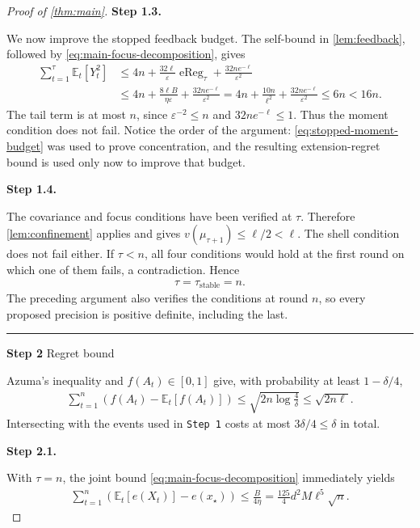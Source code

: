 \documentclass{article}
\newcommand{\proofstep}[2]{%
    \par\medskip
    \noindent
    \textcolor{blue!55!black}{\rule{2pt}{1.2em}}%
    \hspace{0.6em}%
    {\sffamily\bfseries\color{blue!55!black}Step #1}%
    \quad
    {\sffamily #2}%
    \par\smallskip
}
\newcommand{\proofstepinline}[1]{%
    {\normalfont\normalsize\bfseries\color{blue!55!black}Step #1.}\enspace
}
\newcommand{\E}{\mathbb E}
\newcommand{\1}{\mathbf 1}
\newcommand{\eps}{\varepsilon}
\begin{document}
\begin{proof}[Proof of \cref{thm:main}]
    \proofstepinline{1.3}
    We now improve the stopped feedback budget. The self-bound in
    \cref{lem:feedback}, followed by \eqref{eq:main-focus-decomposition},
    gives
    \begin{align}
        \sum_{t=1}^\tau\E_t[Y_t^2]
         & \leq4n+\frac{32\ell}{\eps}\operatorname{eReg}_\tau
        +\frac{32ne^{-\ell}}{\eps^2}
        \\
         & \leq4n+\frac{8\ell B}{\eta\eps}
        +\frac{32ne^{-\ell}}{\eps^2}
        =4n+\frac{10n}{\ell^2}
        +\frac{32ne^{-\ell}}{\eps^2}
        \leq6n<16n.
        \label{eq:predictable-Y2}
    \end{align}
    The tail term is at most $n$, since $\eps^{-2}\leq n$ and
    $32ne^{-\ell}\leq1$. Thus the moment condition does not fail.
    Notice the order of the argument: \eqref{eq:stopped-moment-budget}
    was used to prove concentration, and the resulting extension-regret
    bound is used only now to improve that budget.

    \proofstepinline{1.4}
    The covariance and focus conditions have been verified at $\tau$.
    Therefore \cref{lem:confinement} applies and gives
    $v(\mu_{\tau+1})\leq\ell/2<\ell$. The shell condition does not fail either.
    If $\tau<n$, all four conditions would hold at the first round on
    which one of them fails, a contradiction. Hence
    \begin{align}
        \tau=\tau_{\mathrm{stable}}=n.
        \label{eq:main-stability}
    \end{align}
    The preceding argument also verifies the conditions at round $n$,
    so every proposed precision is positive definite, including the last.

    \proofstep{2}{Regret bound}
    Azuma's inequality and $f(A_t)\in[0,1]$ give, with probability at least
    $1-\delta/4$,
    \begin{align}
        \sum_{t=1}^n\left(f(A_t)-\E_t[f(A_t)]\right)
        \leq\sqrt{2n\log\frac4\delta}
        \leq\sqrt{2n\ell}.
        \label{eq:action-martingale}
    \end{align}
    Intersecting with the events used in \texttt{Step 1} costs at most
    $3\delta/4\leq\delta$ in total.

    \proofstepinline{2.1}
    With $\tau=n$, the joint bound \eqref{eq:main-focus-decomposition}
    immediately yields
    \begin{align}
        \sum_{t=1}^n\left(\E_t[e(X_t)]-e(x_\star)\right)
        \leq\frac B{4\eta}
        =\frac{125}{4}d^2M\ell^5\sqrt n.
        \label{eq:main-extension-regret}
    \end{align}


\end{proof}
\end{document}
